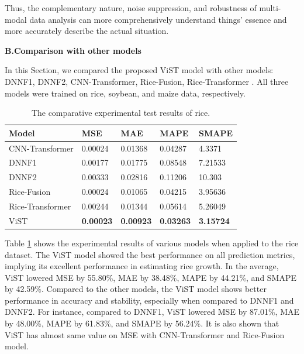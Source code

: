 \documentclass[acmsmall,manuscript, screen, review]{acmart}
\begin{document}
Thus, the complementary nature, noise suppression, and robustness of multi-modal data analysis can more comprehensively understand things’ essence and more accurately describe the actual situation.




\textbf{B.Comparison with other models}

In this Section, we compared the proposed ViST model with other models: DNNF1, DNNF2, CNN-Transformer, Rice-Fusion, Rice-Transformer . All three models were trained on rice, soybean, and maize data, respectively.

\begin{table}[htbp]
  \centering
  \caption{The comparative experimental test results of rice.}
    \begin{tabular}{lllll}
    \toprule
    Model & MSE   & MAE   & MAPE  & SMAPE \\
    \midrule
    CNN-Transformer & 0.00024 & 0.01368 & 0.04287 & 4.3371 \\
    DNNF1 & 0.00177 & 0.01775 & 0.08548 & 7.21533 \\
    DNNF2 & 0.00333 & 0.02816 & 0.11206 & 10.303 \\
    Rice-Fusion & 0.00024 & 0.01065 & 0.04215 & 3.95636 \\
    Rice-Transformer & 0.00244 & 0.01344 & 0.05614 & 5.26049 \\
    ViST  & \textbf{0.00023} & \textbf{0.00923} & \textbf{0.03263} & \textbf{3.15724} \\
    \bottomrule
    \end{tabular}%
  \label{rice_results}
\end{table}%

Table \ref{rice_results} shows the experimental results of various models when applied to the rice dataset. The ViST model showed the best performance on all prediction metrics, implying its excellent performance in estimating rice growth. In the average, ViST lowered MSE by 55.80\%, MAE by 38.48\%, MAPE by 44.21\%, and SMAPE by 42.59\%. Compared to the other models, the ViST model shows better performance in accuracy and stability, especially when compared to DNNF1 and DNNF2. For instance, compared to DNNF1, ViST lowered MSE by 87.01\%, MAE by 48.00\%, MAPE by 61.83\%, and SMAPE by 56.24\%. It is also shown that ViST has almost same value on MSE with CNN-Transformer and Rice-Fusion model.
\end{document}
